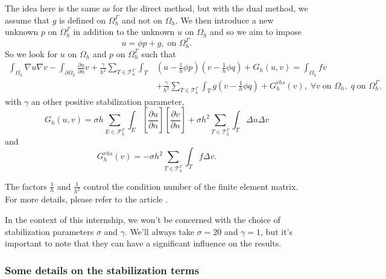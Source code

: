 The idea here is the same as for the direct method, but with the dual method, we assume that $g$ is defined on $\Omega_h^\Gamma$ and not on $\Omega_h$. We then introduce a new unknown $p$ on $\Omega_h^\Gamma$ in addition to the unknown $u$ on $\Omega_h$ and so we aim to impose
\begin{equation*}
	u=\phi p+g, \; \text{on } \Omega_h^\Gamma.
\end{equation*}
So we look for $u$ on $\Omega_h$ and $p$ on $\Omega_h^\Gamma$ such that
\begin{align*}
	\int_{\Omega_h}\nabla u\nabla v-\int_{\partial\Omega_h}\frac{\partial u}{\partial n} v + \frac{\gamma}{h^2} \sum_{T\in\mathcal{T}_h^\Gamma}\int_T &\left(u-\frac{1}{h}\phi p\right)\left(v-\frac{1}{h}\phi q\right) + G_h(u,v) = \int_{\Omega_h}fv \\
	&+ \frac{\gamma}{h^2} \sum_{T\in\mathcal{T}_h^\Gamma}\int_T g\left(v-\frac{1}{h}\phi q\right) + G_h^{rhs}(v), \; \forall v \; \text{on } \Omega_h, \; q \; \text{on } \Omega_h^\Gamma.
\end{align*}
with $\gamma$ an other positive stabilization parameter,
\begin{equation*}
	G_h(u,v)=\sigma h\sum_{E\in\mathcal{F}_h^\Gamma}\int_E\left[\frac{\partial u}{\partial n}\right]\left[\frac{\partial v}{\partial n}\right]+\sigma h^2\sum_{T\in\mathcal{T}_h^\Gamma}\int_T \Delta u\Delta v
\end{equation*}
and
\begin{equation*}
	G_h^{rhs}(v)=-\sigma h^2\sum_{T\in\mathcal{T}_h^\Gamma}\int_T f\Delta v.
\end{equation*}
\begin{Rem}
	The factors $\frac{1}{h}$ and $\frac{1}{h^2}$ control the condition number of the finite element matrix. For more details, please refer to the article \cite{duprez_new_2023}.
\end{Rem}
\begin{Rem}
	In the context of this internship, we won't be concerned with the choice of stabilization parameters $\sigma$ and $\gamma$. We'll always take $\sigma=20$ and $\gamma=1$, but it's important to note that they can have a significant influence on the results.
\end{Rem}

\subsubsection{Some details on the stabilization terms} \label{FEMs.PhiFEM.stab}  

